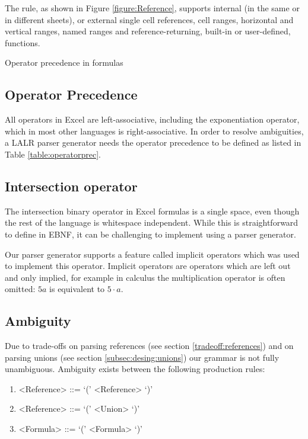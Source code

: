 \documentclass[conference]{IEEEtran}
\begin{document}
The  rule, as shown in Figure \ref{figure:Reference}, supports internal (in the same or in different sheets), or external single cell references, cell ranges, horizontal and vertical ranges, named ranges and reference-returning, built-in or user-defined, functions.

\begin{table}
	\centering
	\caption{Operator precedence in formulas}
	\label{table:operatorprec}
	
\end{table}

\subsection{Operator Precedence}
\label{sec:operatorprecedence}

All operators in Excel are left-associative, including the exponentiation operator, which in most other languages is right-associative.
In order to resolve ambiguities, a LALR parser generator needs the operator precedence to be defined as listed in Table \ref{table:operatorprec}.

\subsection{Intersection operator}

The intersection binary operator in Excel formulas is a single space, even though the rest of the language is whitespace independent. While this is straightforward to define in EBNF, it can be challenging to implement using a parser generator.

Our parser generator supports a feature called implicit operators which was used to implement this operator.
Implicit operators are operators which are left out and only implied, for example in calculus the multiplication operator is often omitted: $5a$ is equivalent to $5 \cdot a$.

\subsection{Ambiguity}
\label{sec:ambiguity}

Due to trade-offs on parsing references (see section \ref{tradeoff:references}) and on parsing unions (see section \ref{subsec:desing:unions}) our grammar is not fully unambiguous.
Ambiguity exists between the following production rules:
\begin{enumerate}
\item \begin{grammar}<Reference> ::= `(' <Reference> `)'\end{grammar}
\item \begin{grammar}<Reference> ::= `(' <Union> `)'\end{grammar}
\item \begin{grammar}<Formula> ::= `(' <Formula> `)'\end{grammar}
\end{enumerate}
\end{document}

